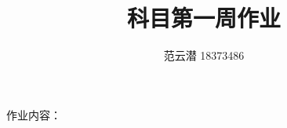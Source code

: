 \documentclass[lang=cn,11pt,a4paper,cite=authoryear]{elegantpaper}
\title{科目\quad 第一周作业}
\author{范云潜 18373486}
\institute{微电子学院 184111 班}
\date{\zhtoday}
\begin{document}
\maketitle

作业内容：

\tableofcontents


\end{document}
